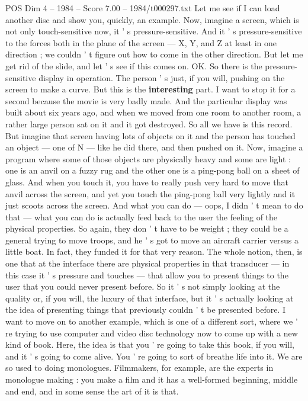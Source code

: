 \begin{textsample}{POS Dim 4 – 1984 – Score 7.00 – 1984/t000297.txt}
Let me see if I can load another disc and show you, quickly, an example.
Now, imagine a screen, which is not only touch-sensitive now, it ' s pressure-sensitive.
And it ' s pressure-sensitive to the forces both in the plane of the screen — X, Y, and Z at least in one direction ; we couldn ' t figure out how to come in the other direction.
But let me get rid of the slide, and let ' s see if this comes on.
OK.
So there is the pressure-sensitive display in operation.
The person ' s just, if you will, pushing on the screen to make a curve.
But this is the \textbf{interesting} part.
I want to stop it for a second because the movie is very badly made.
And the particular display was built about six years ago, and when we moved from one room to another room, a rather large person sat on it and it got destroyed.
So all we have is this record.
But imagine that screen having lots of objects on it and the person has touched an object — one of N — like he did there, and then pushed on it.
Now, imagine a program where some of those objects are physically heavy and some are light : one is an anvil on a fuzzy rug and the other one is a ping-pong ball on a sheet of glass.
And when you touch it, you have to really push very hard to move that anvil across the screen, and yet you touch the ping-pong ball very lightly and it just scoots across the screen.
And what you can do — oops, I didn ' t mean to do that — what you can do is actually feed back to the user the feeling of the physical properties.
So again, they don ' t have to be weight ; they could be a general trying to move troops, and he ' s got to move an aircraft carrier versus a little boat.
In fact, they funded it for that very reason.
The whole notion, then, is one that at the interface there are physical properties in that transducer — in this case it ' s pressure and touches — that allow you to present things to the user that you could never present before.
So it ' s not simply looking at the quality or, if you will, the luxury of that interface, but it ' s actually looking at the idea of presenting things that previously couldn ' t be presented before.
I want to move on to another example, which is one of a different sort, where we ' re trying to use computer and video disc technology now to come up with a new kind of book.
Here, the idea is that you ' re going to take this book, if you will, and it ' s going to come alive.
You ' re going to sort of breathe life into it.
We are so used to doing monologues.
Filmmakers, for example, are the experts in monologue making : you make a film and it has a well-formed beginning, middle and end, and in some sense the art of it is that.

\end{textsample}
